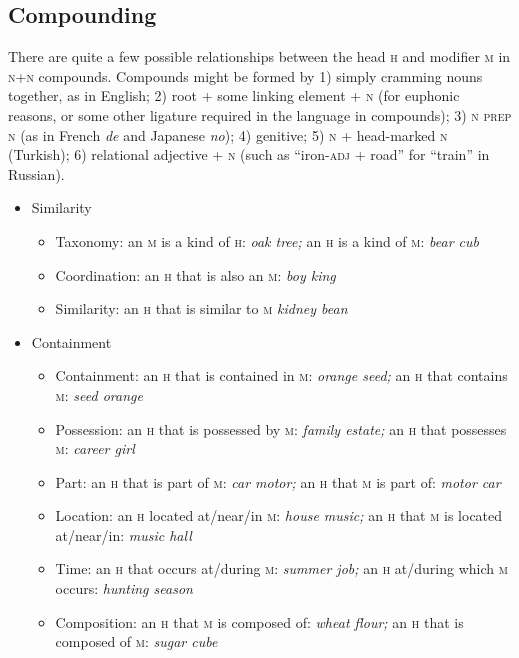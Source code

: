 \documentclass[11pt]{article}
\newcommand{\E}[1]{\textit{#1}}   %
\newcommand{\I}[1]{\textsc{#1}}   %
\newenvironment{grammarlist}%
 {\begin{itemize}\addtolength{\itemsep}{-0.5\baselineskip}\ignorespaces}%
 {\end{itemize}\ignorespacesafterend}
\begin{document}
\subsection{Compounding}
There are quite a few possible relationships between the head \I{h}
and modifier \I{m} in \I{n+n} compounds.  Compounds might be formed by
1) simply cramming nouns together, as in English; 2) root + some
linking element + \I{n} (for euphonic reasons, or some other ligature
required in the language in compounds); 3) \I{n prep n} (as in French
\E{de} and Japanese \E{no}); 4) genitive; 5) \I{n} + head-marked \I{n}
(Turkish); 6) relational adjective + \I{n} (such as ``iron-\I{adj} +
road'' for ``train'' in Russian).

\begin{grammarlist}
  \item Similarity
    \begin{grammarlist}
      \item Taxonomy: an \I{m} is a kind of \I{h}: \E{oak tree;} an
        \I{h} is a kind of \I{m}: \E{bear cub}
      \item Coordination: an \I{h} that is also an \I{m}: \E{boy king}
      \item Similarity: an \I{h} that is similar to \I{m} \E{kidney bean}
    \end{grammarlist}  
  \item Containment
    \begin{grammarlist}
      \item Containment: an \I{h} that is contained in \I{m}:
        \E{orange seed;} an \I{h} that contains \I{m}: \E{seed orange}
      \item Possession: an \I{h} that is possessed by \I{m}: \E{family
        estate;} an \I{h} that possesses \I{m}: \E{career girl}
      \item Part: an \I{h} that is part of \I{m}: \E{car motor;} an
        \I{h} that \I{m} is part of: \E{motor car}
      \item Location: an \I{h} located at/near/in \I{m}: \E{house
        music;} an \I{h} that \I{m} is located at/near/in: \E{music
        hall}
      \item Time: an \I{h} that occurs at/during \I{m}: \E{summer
        job;} an \I{h} at/during which \I{m} occurs: \E{hunting season}
      \item Composition: an \I{h} that \I{m} is composed of: \E{wheat
        flour;} an \I{h} that is composed of \I{m}: \E{sugar cube}

\end{grammarlist}
\end{grammarlist}
\end{document}
